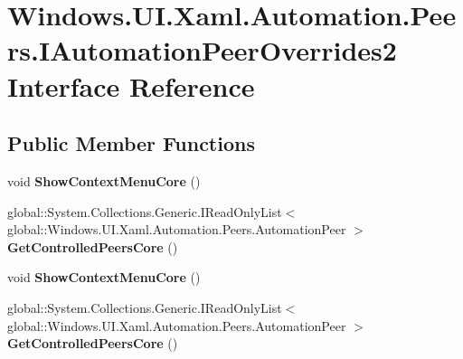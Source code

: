 \hypertarget{interface_windows_1_1_u_i_1_1_xaml_1_1_automation_1_1_peers_1_1_i_automation_peer_overrides2}{}\section{Windows.\+U\+I.\+Xaml.\+Automation.\+Peers.\+I\+Automation\+Peer\+Overrides2 Interface Reference}
\label{interface_windows_1_1_u_i_1_1_xaml_1_1_automation_1_1_peers_1_1_i_automation_peer_overrides2}
\subsection*{Public Member Functions}
\begin{DoxyCompactItemize}
\item 
\mbox{\label{interface_windows_1_1_u_i_1_1_xaml_1_1_automation_1_1_peers_1_1_i_automation_peer_overrides2_aaa6a5d94c2ff7373d5a1a1828b2e8327}} 
void {\bfseries Show\+Context\+Menu\+Core} ()
\item 
\mbox{\label{interface_windows_1_1_u_i_1_1_xaml_1_1_automation_1_1_peers_1_1_i_automation_peer_overrides2_a67a4e7bd48e87eab95f6dde4eb96dfeb}} 
global\+::\+System.\+Collections.\+Generic.\+I\+Read\+Only\+List$<$ global\+::\+Windows.\+U\+I.\+Xaml.\+Automation.\+Peers.\+Automation\+Peer $>$ {\bfseries Get\+Controlled\+Peers\+Core} ()
\item 
\mbox{\label{interface_windows_1_1_u_i_1_1_xaml_1_1_automation_1_1_peers_1_1_i_automation_peer_overrides2_aaa6a5d94c2ff7373d5a1a1828b2e8327}} 
void {\bfseries Show\+Context\+Menu\+Core} ()
\item 
\mbox{\label{interface_windows_1_1_u_i_1_1_xaml_1_1_automation_1_1_peers_1_1_i_automation_peer_overrides2_a67a4e7bd48e87eab95f6dde4eb96dfeb}} 
global\+::\+System.\+Collections.\+Generic.\+I\+Read\+Only\+List$<$ global\+::\+Windows.\+U\+I.\+Xaml.\+Automation.\+Peers.\+Automation\+Peer $>$ {\bfseries Get\+Controlled\+Peers\+Core} ()

\end{DoxyCompactItemize}
